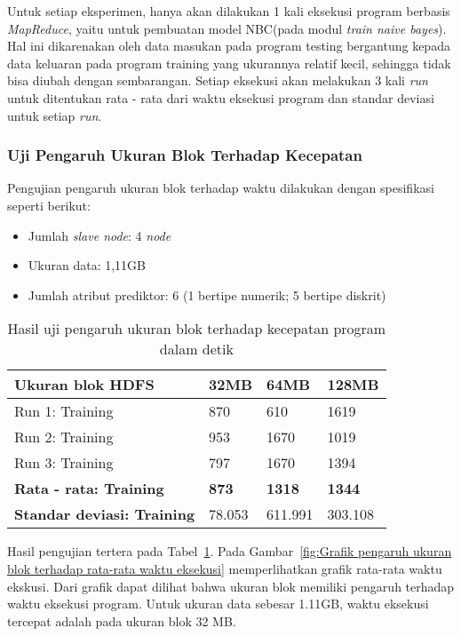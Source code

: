 Untuk setiap eksperimen, hanya akan dilakukan 1 kali eksekusi program berbasis \textit{MapReduce}, yaitu untuk pembuatan model NBC(pada modul \textit{train naive bayes}). Hal ini dikarenakan oleh data masukan pada program testing bergantung kepada data keluaran pada program training yang ukurannya relatif kecil, sehingga tidak bisa diubah dengan sembarangan. Setiap eksekusi akan melakukan 3 kali \textit{run} untuk ditentukan rata - rata dari waktu eksekusi program dan standar deviasi untuk setiap \textit{run}.

\subsubsection{Uji Pengaruh Ukuran Blok Terhadap Kecepatan}

Pengujian pengaruh ukuran blok terhadap waktu dilakukan dengan spesifikasi seperti berikut:

\begin{itemize}
	\item Jumlah \textit{slave node}: 4 \textit{node}
	\item Ukuran data: 1,11GB
	\item Jumlah atribut prediktor: 6 (1 bertipe numerik; 5 bertipe diskrit)
\end{itemize}

\begin{table}[H]
\label{tab:uji pengaruh ukuran blok}
\centering
\caption{Hasil uji pengaruh ukuran blok terhadap kecepatan program dalam detik}
\begin{tabular}{ | l | l | l | l | }
\hline
Ukuran blok HDFS & 32MB & 64MB & 128MB \\ \hline \hline
Run 1: Training & 870 & 610 & 1619 \\ \hline
Run 2: Training & 953 & 1670 & 1019 \\ \hline
Run 3: Training & 797 & 1670 & 1394 \\ \hline
\textbf{Rata - rata: Training} & \textbf{873} & \textbf{1318} & \textbf{1344} \\ \hline
\textbf{Standar deviasi: Training} & 78.053 & 611.991 & 303.108 \\ \hline
\end{tabular}
\end{table}

Hasil pengujian tertera pada Tabel~\ref{tab:uji pengaruh ukuran blok}. Pada Gambar~\ref{fig:Grafik pengaruh ukuran blok terhadap rata-rata waktu eksekusi} memperlihatkan grafik rata-rata waktu ekskusi. Dari grafik dapat dilihat bahwa ukuran blok memiliki pengaruh terhadap waktu eksekusi program. Untuk ukuran data sebesar 1.11GB, waktu eksekusi tercepat adalah pada ukuran blok 32 MB.

